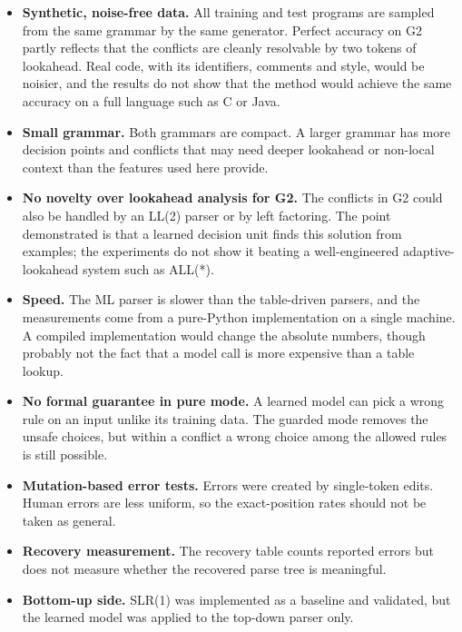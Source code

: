 \documentclass[12pt,a4paper]{article}
\begin{document}
\begin{itemize}
    \item \textbf{Synthetic, noise-free data.} All training and test programs
    are sampled from the same grammar by the same generator. Perfect accuracy
    on G2 partly reflects that the conflicts are cleanly resolvable by two
    tokens of lookahead. Real code, with its identifiers, comments and style,
    would be noisier, and the results do not show that the method would
    achieve the same accuracy on a full language such as C or Java.
    \item \textbf{Small grammar.} Both grammars are compact. A larger grammar
    has more decision points and conflicts that may need deeper lookahead or
    non-local context than the features used here provide.
    \item \textbf{No novelty over lookahead analysis for G2.} The conflicts in
    G2 could also be handled by an LL(2) parser or by left factoring. The point
    demonstrated is that a learned decision unit finds this solution from
    examples; the experiments do not show it beating a well-engineered
    adaptive-lookahead system such as ALL(*).
    \item \textbf{Speed.} The ML parser is slower than the table-driven
    parsers, and the measurements come from a pure-Python implementation on a
    single machine. A compiled implementation would change the absolute
    numbers, though probably not the fact that a model call is more expensive
    than a table lookup.
    \item \textbf{No formal guarantee in pure mode.} A learned model can pick
    a wrong rule on an input unlike its training data. The guarded mode
    removes the unsafe choices, but within a conflict a wrong choice among the
    allowed rules is still possible.
    \item \textbf{Mutation-based error tests.} Errors were created by
    single-token edits. Human errors are less uniform, so the exact-position
    rates should not be taken as general.
    \item \textbf{Recovery measurement.} The recovery table counts reported
    errors but does not measure whether the recovered parse tree is meaningful.
    \item \textbf{Bottom-up side.} SLR(1) was implemented as a baseline and
    validated, but the learned model was applied to the top-down parser only.
\end{itemize}

\end{document}

